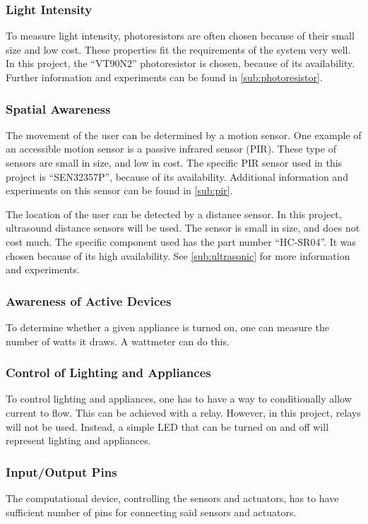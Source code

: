 \subsubsection{Light Intensity}
To measure light intensity, photoresistors are often chosen because of their small size and low cost. These properties fit the requirements of the system very well. In this project, the \enquote{VT90N2} photoresistor is chosen, because of its availability. Further information and experiments can be found in \cref{sub:photoresistor}.

\subsubsection{Spatial Awareness}
The movement of the user can be determined by a motion sensor. One example of an accessible motion sensor is a passive infrared sensor (PIR). These type of sensors are small in size, and low in cost. The specific PIR sensor used in this project is \enquote{SEN32357P}, because of its availability. Additional information and experiments on this sensor can be found in \cref{sub:pir}.

The location of the user can be detected by a distance sensor. In this project, ultrasound distance sensors will be used. The sensor is small in size, and does not cost much. The specific component used has the part number \enquote{HC-SR04}. It was chosen because of its high availability. See \cref{sub:ultrasonic} for more information and experiments.

\subsubsection{Awareness of Active Devices}
To determine whether a given appliance is turned on, one can measure the number of watts it draws. A wattmeter can do this.

\subsubsection{Control of Lighting and Appliances}
To control lighting and appliances, one has to have a way to conditionally allow current to flow. This can be achieved with a relay. However, in this project, relays will not be used. Instead, a simple LED that can be turned on and off will represent lighting and appliances.

\subsubsection{Input/Output Pins}
The computational device, controlling the sensors and actuators, has to have sufficient number of pins for connecting said sensors and actuators.

